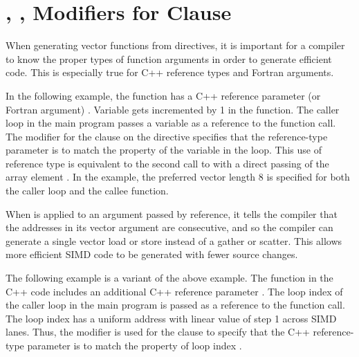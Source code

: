 \section{, ,  Modifiers for  Clause}
\label{sec:linear_modifier}

When generating vector functions from  directives, 
it is important for a compiler to know the proper types of function arguments in
order to generate efficient code.
This is especially true for C++ reference types and Fortran arguments.

In the following example, the function  has a C++ reference
parameter (or Fortran argument) .  Variable  gets incremented by 1 in the function.
The caller loop  in the main program passes 
a variable  as a reference to the function  call.   
The  modifier for the  clause on the 
 directive specifies that the 
reference-type parameter  is to match the property of the variable 
 in the loop.  
This use of reference type is equivalent to the second call to 
 with a direct passing of the array element .  
In the example, the preferred vector 
length 8 is specified for both the caller loop and the callee function.

When  is applied to an argument passed by reference, 
it tells the compiler that the addresses in its vector argument are consecutive,
and so the compiler can generate a single vector load or store instead of 
a gather or scatter. This allows more efficient SIMD code to be generated with 
fewer source changes.


 
The following example is a variant of the above example. The function  
in the C++ code includes an additional C++ reference parameter . 
The loop index  of the caller loop in the main program 
is passed as a reference to the function  call.   
The loop index  has a uniform address with
linear value of step 1 across SIMD lanes. 
Thus, the  modifier is used for the  clause 
to specify that the C++ reference-type parameter  is to match 
the property of loop index .

